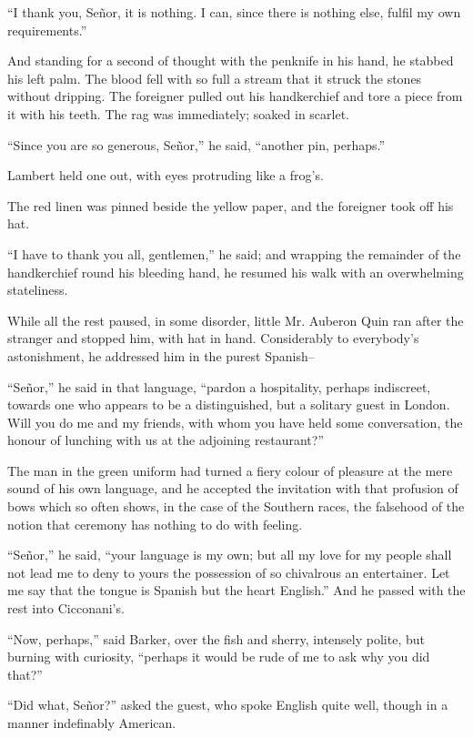 \documentclass{book}
\begin{document}
“I thank you, Señor, it is nothing. I can, since there is nothing else, fulfil my own requirements.”

And standing for a second of thought with the penknife in his hand, he stabbed his left palm. The blood fell with so full a stream that it struck the stones without dripping. The foreigner pulled out his handkerchief and tore a piece from it with his teeth. The rag was immediately; soaked in scarlet.

“Since you are so generous, Señor,” he said, “another pin, perhaps.”

Lambert held one out, with eyes protruding like a frog’s.

The red linen was pinned beside the yellow paper, and the foreigner took off his hat.

“I have to thank you all, gentlemen,” he said; and wrapping the remainder of the handkerchief round his bleeding hand, he resumed his walk with an overwhelming stateliness.

While all the rest paused, in some disorder, little Mr. Auberon Quin ran after the stranger and stopped him, with hat in hand. Considerably to everybody’s astonishment, he addressed him in the purest Spanish–

“Señor,” he said in that language, “pardon a hospitality, perhaps indiscreet, towards one who appears to be a distinguished, but a solitary guest in London. Will you do me and my friends, with whom you have held some conversation, the honour of lunching with us at the adjoining restaurant?”

The man in the green uniform had turned a fiery colour of pleasure at the mere sound of his own language, and he accepted the invitation with that profusion of bows which so often shows, in the case of the Southern races, the falsehood of the notion that ceremony has nothing to do with feeling.

“Señor,” he said, “your language is my own; but all my love for my people shall not lead me to deny to yours the possession of so chivalrous an entertainer. Let me say that the tongue is Spanish but the heart English.” And he passed with the rest into Cicconani’s.

“Now, perhaps,” said Barker, over the fish and sherry, intensely polite, but burning with curiosity, “perhaps it would be rude of me to ask why you did that?”

“Did what, Señor?” asked the guest, who spoke English quite well, though in a manner indefinably American.
\end{document}
